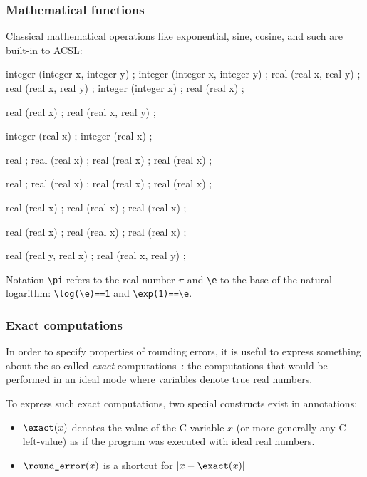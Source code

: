 \subsubsection{Mathematical functions}

Classical mathematical operations like exponential, sine, cosine, and
such are built-in to ACSL:

\begin{listing-nonumber}
integer \min(integer x, integer y) ;
integer \max(integer x, integer y) ;
real \min(real x, real y) ;
real \max(real x, real y) ;
integer \abs(integer x) ;
real \abs(real x) ;

real \sqrt(real x) ;
real \pow(real x, real y) ;

integer \ceil(real x) ;
integer \floor(real x) ;

real \e ;
real \exp(real x) ;
real \log(real x) ;
real (real x) ;

real \pi ;
real \cos(real x) ;
real \sin(real x) ;
real \tan(real x) ;

real \cosh(real x) ;
real \sinh(real x) ;
real \tanh(real x) ;

real \acos(real x) ;
real \asin(real x) ;
real \atan(real x) ;

real (real y, real x) ;
real \hypot(real x, real y) ;
\end{listing-nonumber}

Notation \lstinline|\pi| refers to the real number $\pi$ and \lstinline|\e| to
the base of the natural logarithm: \lstinline|\log(\e)==1| and \lstinline|\exp(1)==\e|.

\subsubsection{Exact computations}

In order to specify properties of rounding errors, it is useful to express
something about the so-called \emph{exact}
computations~\cite{BoldoFilliatre07}: the computations that would be performed
in an ideal mode where variables denote true real numbers.

To express such exact computations, two special
constructs exist in annotations:
\begin{itemize}
\item $\verb|\exact|(x)$ denotes the value of the C variable $x$ (or
  more generally any C left-value) as if the program was executed with
  ideal real numbers.
\item $\verb|\round_error|(x)$ is a shortcut for $|x-\verb|\exact|(x)|$
\end{itemize}

